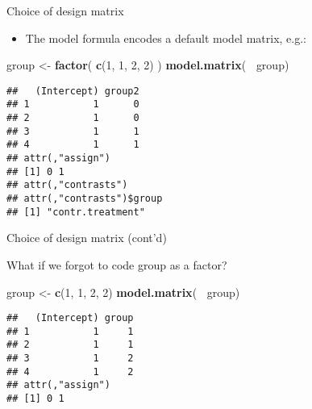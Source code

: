 \documentclass[
  ignorenonframetext,
]{beamer}
\newenvironment{Shaded}{\begin{snugshade}}{\end{snugshade}}
\newcommand{\DecValTok}[1]{\textcolor[rgb]{0.00,0.00,0.81}{#1}}
\newcommand{\KeywordTok}[1]{\textcolor[rgb]{0.13,0.29,0.53}{\textbf{#1}}}
\newcommand{\NormalTok}[1]{#1}
\newcommand{\OperatorTok}[1]{\textcolor[rgb]{0.81,0.36,0.00}{\textbf{#1}}}
\newcommand{\StringTok}[1]{\textcolor[rgb]{0.31,0.60,0.02}{#1}}
\providecommand{\tightlist}{%
  \setlength{\itemsep}{0pt}\setlength{\parskip}{0pt}}
\begin{document}
\begin{frame}[fragile]{Choice of design matrix}
\protect\hypertarget{choice-of-design-matrix}{}

\begin{itemize}
\tightlist
\item
  The model formula encodes a default model matrix, e.g.:
\end{itemize}

\begin{Shaded}
\begin{Highlighting}[]
\NormalTok{group <-}\StringTok{ }\KeywordTok{factor}\NormalTok{( }\KeywordTok{c}\NormalTok{(}\DecValTok{1}\NormalTok{, }\DecValTok{1}\NormalTok{, }\DecValTok{2}\NormalTok{, }\DecValTok{2}\NormalTok{) )}
\KeywordTok{model.matrix}\NormalTok{(}\OperatorTok{~}\StringTok{ }\NormalTok{group)}
\end{Highlighting}
\end{Shaded}

\begin{verbatim}
##   (Intercept) group2
## 1           1      0
## 2           1      0
## 3           1      1
## 4           1      1
## attr(,"assign")
## [1] 0 1
## attr(,"contrasts")
## attr(,"contrasts")$group
## [1] "contr.treatment"
\end{verbatim}

\end{frame}

\begin{frame}[fragile]{Choice of design matrix (cont'd)}
\protect\hypertarget{choice-of-design-matrix-contd}{}

What if we forgot to code group as a factor?

\begin{Shaded}
\begin{Highlighting}[]
\NormalTok{group <-}\StringTok{ }\KeywordTok{c}\NormalTok{(}\DecValTok{1}\NormalTok{, }\DecValTok{1}\NormalTok{, }\DecValTok{2}\NormalTok{, }\DecValTok{2}\NormalTok{)}
\KeywordTok{model.matrix}\NormalTok{(}\OperatorTok{~}\StringTok{ }\NormalTok{group)}
\end{Highlighting}
\end{Shaded}

\begin{verbatim}
##   (Intercept) group
## 1           1     1
## 2           1     1
## 3           1     2
## 4           1     2
## attr(,"assign")
## [1] 0 1
\end{verbatim}

\end{frame}
\end{document}

